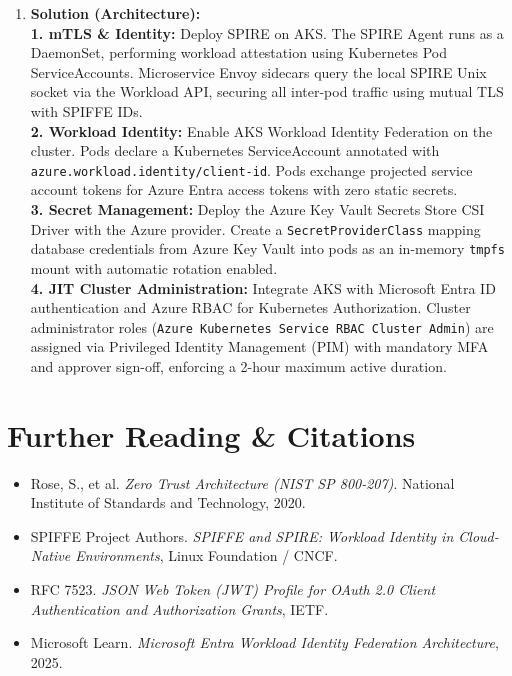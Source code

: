 \begin{enumerate}[leftmargin=18pt]
  \item \textbf{Solution (Architecture):}\\
  \textbf{1. mTLS \& Identity:} Deploy SPIRE on AKS. The SPIRE Agent runs as a DaemonSet, performing workload attestation using Kubernetes Pod ServiceAccounts. Microservice Envoy sidecars query the local SPIRE Unix socket via the Workload API, securing all inter-pod traffic using mutual TLS with SPIFFE IDs.\\
  \textbf{2. Workload Identity:} Enable AKS Workload Identity Federation on the cluster. Pods declare a Kubernetes ServiceAccount annotated with \texttt{azure.workload.identity/client-id}. Pods exchange projected service account tokens for Azure Entra access tokens with zero static secrets.\\
  \textbf{3. Secret Management:} Deploy the Azure Key Vault Secrets Store CSI Driver with the Azure provider. Create a \texttt{SecretProviderClass} mapping database credentials from Azure Key Vault into pods as an in-memory \texttt{tmpfs} mount with automatic rotation enabled.\\
  \textbf{4. JIT Cluster Administration:} Integrate AKS with Microsoft Entra ID authentication and Azure RBAC for Kubernetes Authorization. Cluster administrator roles (\texttt{Azure Kubernetes Service RBAC Cluster Admin}) are assigned via Privileged Identity Management (PIM) with mandatory MFA and approver sign-off, enforcing a 2-hour maximum active duration.
\end{enumerate}

\section{Further Reading \& Citations}
\begin{itemize}[leftmargin=15pt]
  \item Rose, S., et al. \emph{Zero Trust Architecture (NIST SP 800-207)}. National Institute of Standards and Technology, 2020.
  \item SPIFFE Project Authors. \emph{SPIFFE and SPIRE: Workload Identity in Cloud-Native Environments}, Linux Foundation / CNCF.
  \item RFC 7523. \emph{JSON Web Token (JWT) Profile for OAuth 2.0 Client Authentication and Authorization Grants}, IETF.
  \item Microsoft Learn. \emph{Microsoft Entra Workload Identity Federation Architecture}, 2025.
\end{itemize}
